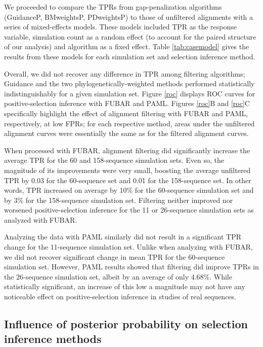 \documentclass[10pt]{article}
\begin{document}
We proceeded to compare the TPRs from gap-penalization algorithms (GuidanceP, BMweightsP, PDweightsP) to those of unfiltered alignments with a series of mixed-effects models. These models included TPR as the response variable, simulation count as a random effect (to account for the paired structure of our analysis) and algorithm as a fixed effect. Table \ref{tab:casemodel} gives the results from these models for each simulation set and selection inference method.

Overall, we did not recover any difference in TPR among filtering algorithms; Guidance and the two phylogenetically-weighted methods performed statistically indistinguishably for a given simulation set. Figure \ref{roc} displays ROC curves for positive-selection inference with FUBAR and PAML. Figures \ref{roc}B and \ref{roc}C specifically highlight the effect of alignment filtering with FUBAR and PAML, respectively, at low FPRs; for each respective method, areas under the unfiltered alignment curves were essentially the same as for the filtered alignment curves.

When processed with FUBAR, alignment filtering did significantly increase the average TPR for the 60 and 158-sequence simulation sets. Even so, the magnitude of its improvements were very small, boosting the average unfiltered TPR by 0.03 for the 60-sequence set and 0.01 for the 158-sequence set. In other words, TPR increased on average by 10\% for the 60-sequence simulation set and by 3\% for the 158-sequence simulation set. Filtering neither improved nor worsened positive-selection inference for the 11 or 26-sequence simulation sets as analyzed with FUBAR.

Analyzing the data with PAML similarly did not result in a significant TPR change for the 11-sequence simulation set. Unlike when analyzing with FUBAR, we did not recover significant change in mean TPR for the 60-sequence simulation set. However, PAML results showed that filtering did improve TPRs in the 26-sequence simulation set, albeit by an average of only 4.68\%. While statistically significant, an increase of this low a magnitude may not have any noticeable effect on positive-selection inference in studies of real sequences. 

\subsection*{Influence of posterior probability on selection inference methods}
\end{document}
